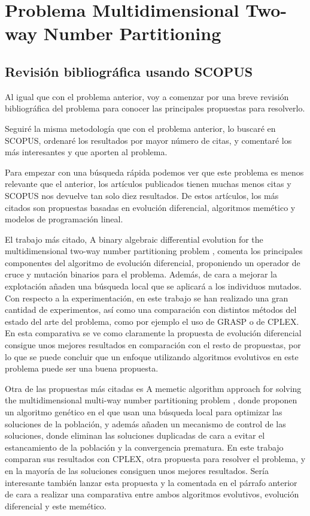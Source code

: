 \section{Problema Multidimensional Two-way Number Partitioning}

\subsection{Revisión bibliográfica usando SCOPUS}

Al igual que con el problema anterior, voy a comenzar por una breve revisión bibliográfica del problema para conocer las principales propuestas para resolverlo.

Seguiré la misma metodología que con el problema anterior, lo buscaré en SCOPUS, ordenaré los resultados por mayor número de citas, y comentaré los más interesantes y que aporten al problema.

Para empezar con una búsqueda rápida podemos ver que este problema es menos relevante que el anterior, los artículos publicados tienen muchas menos citas y SCOPUS nos devuelve tan solo diez resultados. De estos artículos, los más citados son propuestas basadas en evolución diferencial, algoritmos memético y modelos de programación lineal.

El trabajo más citado, A binary algebraic differential evolution for the multidimensional two-way number partitioning problem \cite{evolucionDiferencialM2NP}, comenta los principales componentes del algoritmo de evolución diferencial, proponiendo un operador de cruce y mutación binarios para el problema. Además, de cara a mejorar la explotación añaden una búsqueda local que se aplicará a los individuos mutados. Con respecto a la experimentación, en este trabajo se han realizado una gran cantidad de experimentos, así como una comparación con distintos métodos del estado del arte del problema, como por ejemplo el uso de GRASP o de CPLEX. En esta comparativa se ve como claramente la propuesta de evolución diferencial consigue unos mejores resultados en comparación con el resto de propuestas, por lo que se puede concluir que un enfoque utilizando algoritmos evolutivos en este problema puede ser una buena propuesta.


Otra de las propuestas más citadas es A memetic algorithm approach for solving the multidimensional multi-way number partitioning problem \cite{memeticoM2NP}, donde proponen un algoritmo genético en el que usan una búsqueda local para optimizar las soluciones de la población, y además añaden un mecanismo de control de las soluciones, donde eliminan las soluciones duplicadas de cara a evitar el estancamiento de la población y la convergencia prematura. En este trabajo comparan sus resultados con CPLEX, otra propuesta para resolver el problema, y en la mayoría de las soluciones consiguen unos mejores resultados. Sería interesante también lanzar esta propuesta y la comentada en el párrafo anterior de cara a realizar una comparativa entre ambos algoritmos evolutivos, evolución diferencial y este memético.

